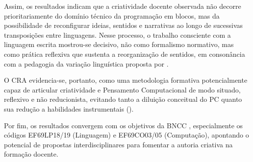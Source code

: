 \documentclass[portuguese]{textolivre}
\begin{document}
Assim, os resultados indicam que a criatividade docente observada não decorre prioritariamente do domínio técnico da programação em blocos, mas da possibilidade de reconfigurar ideias, sentidos e narrativas ao longo de sucessivas transposições entre linguagens. Nesse processo, o trabalho consciente com a linguagem escrita mostrou-se decisivo, não como formalismo normativo, mas como prática reflexiva que sustenta a reorganização de sentidos, em consonância com a pedagogia da variação linguística proposta por \textcite{faraco2015}.

O CRA evidencia-se, portanto, como uma metodologia formativa potencialmente capaz de articular criatividade e Pensamento Computacional de modo situado, reflexivo e não reducionista, evitando tanto a diluição conceitual do PC quanto sua redução a habilidades instrumentais ().

\begin{table}[ht]
\centering
\caption{Síntese da manifestação criativa por Grupo e Linguagem.}
\label{tab:sintese}

\small
\setlength{\tabcolsep}{3pt}


\vspace{0.3cm}
\end{table}

Por fim, os resultados convergem com os objetivos da BNCC \cite{bncc2018,cne2022}, especialmente os códigos EF69LP18/19 (Linguagem) e EF69CO03/05 (Computação), apontando o potencial de propostas interdisciplinares para fomentar a autoria criativa na formação docente.
\end{document}

